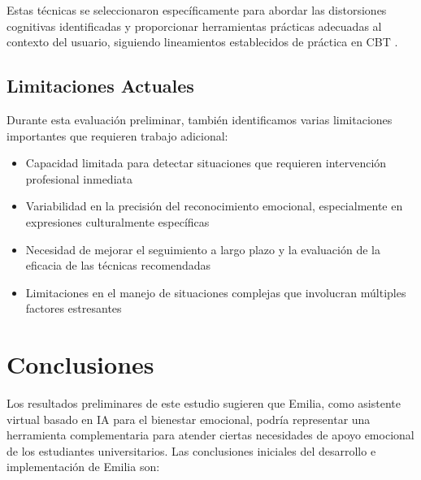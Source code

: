 \documentclass[conference]{IEEEtran}
\begin{document}
Estas técnicas se seleccionaron específicamente para abordar las distorsiones cognitivas identificadas y proporcionar herramientas prácticas adecuadas al contexto del usuario, siguiendo lineamientos establecidos de práctica en CBT \cite{b17}.

\subsection{Limitaciones Actuales}
Durante esta evaluación preliminar, también identificamos varias limitaciones importantes que requieren trabajo adicional:

\begin{itemize}
\item Capacidad limitada para detectar situaciones que requieren intervención profesional inmediata
\item Variabilidad en la precisión del reconocimiento emocional, especialmente en expresiones culturalmente específicas
\item Necesidad de mejorar el seguimiento a largo plazo y la evaluación de la eficacia de las técnicas recomendadas
\item Limitaciones en el manejo de situaciones complejas que involucran múltiples factores estresantes
\end{itemize}

\section{Conclusiones}
Los resultados preliminares de este estudio sugieren que Emilia, como asistente virtual basado en IA para el bienestar emocional, podría representar una herramienta complementaria para atender ciertas necesidades de apoyo emocional de los estudiantes universitarios. Las conclusiones iniciales del desarrollo e implementación de Emilia son:
\end{document}
